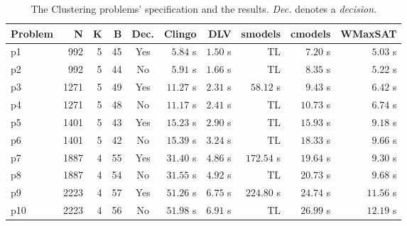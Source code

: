 \documentclass[]{article}
\begin{document}
\begin{table}[h]
\caption{The Clustering problems' specification and the results. \textit{Dec.} denotes a \textit{decision}.}
\label{tab:clustering_results}
\vspace{1em}
\scriptsize
\begin{tabular}{lrrrcrrrrr}
\toprule
Problem & N & K & B & Dec. & Clingo & DLV & smodels & cmodels & WMaxSAT \\
\midrule
p1 & 992 & 5 & 45 & Yes  & $ 5.84 $ s    & $ 1.50 $ s    & TL            & $ 7.20 $ s    & $ 5.03 $ s \\
p2 & 992 & 5 & 44 & No   & $ 5.91 $ s    & $ 1.66 $ s    & TL            & $ 8.35 $ s    & $ 5.22 $ s \\
p3 & 1271 & 5 & 49 & Yes & $ 11.27 $ s   & $ 2.31 $ s    & $ 58.12 $ s   & $ 9.43 $ s    & $ 6.42 $ s \\
p4 & 1271 & 5 & 48 & No  & $ 11.17 $ s   & $ 2.41 $ s    & TL            & $ 10.73 $ s   & $ 6.74 $ s \\
p5 & 1401 & 5 & 43 & Yes & $ 15.23 $ s   & $ 2.90 $ s    & TL            & $ 15.93 $ s   & $ 9.18 $ s \\
p6 & 1401 & 5 & 42 & No  & $ 15.39 $ s   & $ 3.24 $ s    & TL            & $ 18.33 $ s   & $ 9.66 $ s \\
p7 & 1887 & 4 & 55 & Yes & $ 31.40 $ s   & $ 4.86 $ s    & $ 172.54 $ s  & $ 19.64 $ s   & $ 9.30 $ s \\
p8 & 1887 & 4 & 54 & No  & $ 31.55 $ s   & $ 4.92 $ s    & TL            & $ 20.73 $ s   & $ 9.68 $ s \\
p9 & 2223 & 4 & 57 & Yes & $ 51.26 $ s   & $ 6.75 $ s    & $ 224.80 $ s  & $ 24.74 $ s   & $ 11.56 $ s \\
p10 & 2223 & 4 & 56 & No  & $ 51.98 $ s   & $ 6.91 $ s    & TL            & $ 26.99 $ s   & $ 12.19 $ s \\
\bottomrule
\end{tabular}
\end{table}
\end{document}
